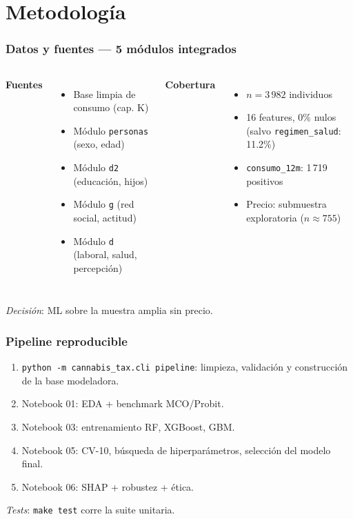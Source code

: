 \section{Metodología}

\begin{frame}
\frametitle{Datos y fuentes — 5 módulos integrados}
\begin{columns}[T]
\textbf{Fuentes}
\begin{itemize}
\item Base limpia de consumo (cap. K)
\item Módulo \texttt{personas} (sexo, edad)
\item Módulo \texttt{d2} (educación, hijos)
\item Módulo \texttt{g} (red social, actitud)
\item Módulo \texttt{d} (laboral, salud, percepción)
\end{itemize}

\textbf{Cobertura}
\begin{itemize}
\item \(n=3\,982\) individuos
\item 16 features, 0\% nulos (salvo \texttt{regimen\_salud}: 11.2\%)
\item \texttt{consumo\_12m}: 1\,719 positivos
\item Precio: submuestra exploratoria ($n{\approx}755$)
\end{itemize}
\end{columns}
\vspace{0.3cm}
\textit{Decisión}: ML sobre la muestra amplia sin precio.
\end{frame}

\begin{frame}
\frametitle{Pipeline reproducible}
\begin{enumerate}
\item \texttt{python -m cannabis\_tax.cli pipeline}: limpieza, validación y construcción de la base modeladora.
\item Notebook 01: EDA + benchmark MCO/Probit.
\item Notebook 03: entrenamiento RF, XGBoost, GBM.
\item Notebook 05: CV-10, búsqueda de hiperparámetros, selección del modelo final.
\item Notebook 06: SHAP + robustez + ética.
\end{enumerate}
\vspace{0.3cm}
\textit{Tests}: \texttt{make test} corre la suite unitaria.
\end{frame}

